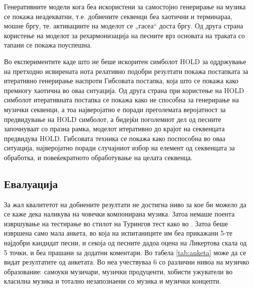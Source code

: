 Генеративните модели кога беа искористени за самостојно генерирање на музика се покажа неадекватни, т.е. добиените секвенци беа хаотични и терминараа, мошне бргу, те. активациите на моделот се „гасеа“ доста бргу. Од друга страна користење на моделот за рехармонизација на песните врз основата на траката со тапани се покажа поуспешна.

Во експериментите каде што не беше искоритен симболот HOLD за оддржување на претходно исвирената нота релативно подобри резултати покажа постапката за итеративно генерирање наспроти Гибсовата постапка, која што се покажа како премногу хаотична во оваа ситуација. Од друга страна при користење на HOLD симболот итеративната постапка се покажа како не способна за генерирање на музички секвенци, а тоа најверојатно е поради преголемата веројатност за предвидување на HOLD симболот, а бидејќи поголемиот дел од песните започнуваат со празна рамка, моделот итеративно до крајот на секвенцата предвидува HOLD. Гибсовата техника се покажа како поспособна во оваа ситуација, најверојатно поради случајниот избор на елемент од секвенцата за обработка, и повеќекратното обработување на целата секвенца. 

\subsection{Евалуација}

За жал квалитетот на добиените резултати не достигна ниво за кое би можело да се каже дека наликува на човечки компонирана музика. Затоа немаше поента извршување на тестирање во стилот на Турингов тест како во \cite{Hadjeres2016,Liang2017,Yang2017}. Затоа беше извршена само мала анкета, во која на испитаниците им беа прикажани 5-те најдобри кандидат песни, и секоја од песните дадоа оцена на Ликертова скала од 5 точки, и беа прашани за додатни коментари. Во табела \ref{tab:anketa} може да се видат резултатите од анкетата. Во неа учествуваа 6 со различни нивоа на музичко образование: самоуки музичари, музички продуценти, хобисти ужуватели во класилна музика и тотално незапознаени со музика и музички концепти. 

